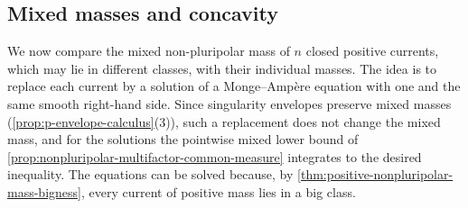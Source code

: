 \subsection{Mixed masses and concavity}
\label{sec:ordinary-mixed-mass-concavity}
We now compare the mixed non-pluripolar mass of $n$ closed positive currents, which may lie in different classes, with their individual masses. The idea is to replace each current by a solution of a Monge--Amp\`ere equation with one and the same smooth right-hand side. Since singularity envelopes preserve mixed masses (\cref{prop:p-envelope-calculus}(3)), such a replacement does not change the mixed mass, and for the solutions the pointwise mixed lower bound of \cref{prop:nonpluripolar-multifactor-common-measure} integrates to the desired inequality. The equations can be solved because, by \cref{thm:positive-nonpluripolar-mass-bigness}, every current of positive mass lies in a big class.

